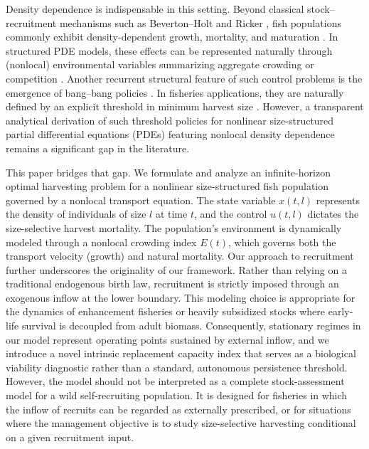 \documentclass[pdflatex,sn-mathphys-num]{sn-jnl}
\theoremstyle{thmstyleone}
\theoremstyle{definition}
\theoremstyle{remark}
\begin{document}
Density dependence is indispensable in this setting. Beyond classical stock--recruitment mechanisms such as Beverton--Holt and Ricker \cite{beverton_dynamics_1993,ricker_stock_1954,yu2026chemotactic}, fish populations commonly exhibit density-dependent growth, mortality, and maturation 
\cite{gao2022rolling,tuffley_density-dependence_2024,yu2026microscopic,accolla_density-dependent_2024,horbowy_effects_2025,wang2025multi}. 
In structured PDE models, these effects can be represented naturally through (nonlocal) environmental variables summarizing aggregate crowding or competition  \cite{de_roos_simplifying_2008,ni_optimal_2023,ainseba_population_2022}.
Another recurrent structural feature of such control problems is the emergence of bang--bang policies \cite{opmeer_optimal_2025}. 
In fisheries applications, they are naturally defined by an explicit threshold in minimum harvest size \cite{lavin_minimum_2021,clark_mathematical_1976,cai2026optimal,hritonenko_structure_2007}. 
However, a transparent analytical derivation of such threshold policies for nonlinear size-structured partial differential equations (PDEs) featuring nonlocal density dependence remains a significant gap in the literature.

This paper bridges that gap. We formulate and analyze an infinite-horizon optimal harvesting problem for a nonlinear size-structured fish population governed by a nonlocal transport equation. The state variable $x(t,l)$ represents the density of individuals of size $l$ at time $t$, and the control $u(t,l)$ dictates the size-selective harvest mortality. The population's environment is dynamically modeled through a nonlocal crowding index $E(t)$, which governs both the transport velocity (growth) and natural mortality. 
Our approach to recruitment further underscores the originality of our framework. Rather than relying on a traditional endogenous birth law, recruitment is strictly imposed through an exogenous inflow at the lower boundary. This modeling choice is appropriate for the dynamics of enhancement fisheries or heavily subsidized stocks where early-life survival is decoupled from adult biomass. Consequently, stationary regimes in our model represent operating points sustained by external inflow, and we introduce a novel intrinsic replacement capacity index that serves as a biological viability diagnostic rather than a standard, autonomous persistence threshold. 
However, the model should not be interpreted as a complete stock-assessment
model for a wild self-recruiting population. It is designed for fisheries in
which the inflow of recruits can be regarded as externally prescribed, or for
situations where the management objective is to study size-selective harvesting
conditional on a given recruitment input.
\end{document}
